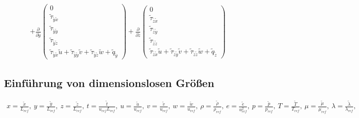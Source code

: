 \begin{align*}
+\frac{\partial}{\partial \tilde{y}}
\begin{pmatrix}
0
\\
\tilde{\tau}_{\tilde{y}\tilde{x}}
\\
\tilde{\tau}_{\tilde{y}\tilde{y}}
\\
\tilde{\tau}_{\tilde{y}\tilde{z}}
\\
\tilde{\tau}_{\tilde{y}\tilde{x}}\tilde{u}+\tilde{\tau}_{\tilde{y}\tilde{y}}\tilde{v}+\tilde{\tau}_{\tilde{y}\tilde{z}}\tilde{w}+\tilde{q}_{\tilde{y}}
\end{pmatrix}
+
\frac{\partial}{\partial \tilde{z}}
\begin{pmatrix}
0
\\
\tilde{\tau}_{\tilde{z}\tilde{x}}
\\
\tilde{\tau}_{\tilde{z}\tilde{y}}
\\
\tilde{\tau}_{\tilde{z}\tilde{z}}
\\
\tilde{\tau}_{\tilde{z}\tilde{x}}\tilde{u}+\tilde{\tau}_{\tilde{z}\tilde{y}}\tilde{v}+\tilde{\tau}_{\tilde{z}\tilde{z}}\tilde{w}+\tilde{q}_{\tilde{z}}
\end{pmatrix}
\end{align*}


\subsection{Einführung von dimensionslosen Größen}
\begin{align*}
x=\frac{\tilde{x}}{{L}_{ref}},\ 
y=\frac{\tilde{y}}{{L}_{ref}},\ 
z=\frac{\tilde{z}}{{L}_{ref}},\ 
t=\frac{\tilde{t}}{{u}_{ref} {L}_{ref}},\ 
u=\frac{\tilde{u}}{{u}_{ref}},\
v=\frac{\tilde{v}}{{u}_{ref}},\ 
w=\frac{\tilde{w}}{{u}_{ref}},\  
\rho=\frac{\tilde{\rho}}{{\rho}_{ref}},\ 
e=\frac{\tilde{e}}{{u}_{ref}^2},\ 
p=\frac{\tilde{p}}{{p}_{ref}},\ 
T=\frac{\tilde{T}}{{T}_{ref}},\
\mu=\frac{\tilde{\mu}}{{\mu}_{ref}},\ 
\lambda=\frac{\tilde{\lambda}}{{\lambda}_{ref}},\  
\end{align*}


